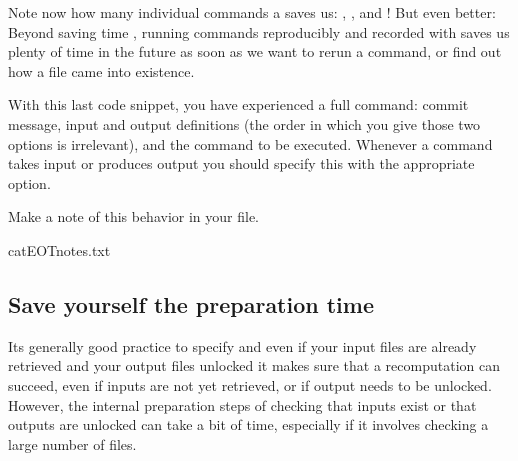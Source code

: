 \sphinxAtStartPar
Note now how many individual commands a  saves us:
, , and !
But even better: Beyond saving time , running commands reproducibly and
recorded with  saves us plenty of time in the future as soon
as we want to rerun a command, or find out how a file came into existence.

\sphinxAtStartPar
With this last code snippet, you have experienced a full  command: commit message,
input and output definitions (the order in which you give those two options is irrelevant),
and the command to be executed. Whenever a command takes input or produces output you should specify
this with the appropriate option.

\sphinxAtStartPar
Make a note of this behavior in your  file.

\begin{sphinxVerbatim}[commandchars=\\\{\}]
cat\PYGZlt{}\PYGZlt{}EOT\PYGZgt{}\PYGZgt{}notes.txt

\end{sphinxVerbatim}


\subsection{Save yourself the preparation time}
\label{\detokenize{basics/101-110-run2:save-yourself-the-preparation-time}}
\sphinxAtStartPar
Its generally good practice to specify  and  even if your input files are already retrieved and your output files unlocked \textendash{} it makes sure that a recomputation can succeed, even if inputs are not yet retrieved, or if output needs to be unlocked.
However, the internal preparation steps of checking that inputs exist or that outputs are unlocked can take a bit of time, especially if it involves checking a large number of files.


